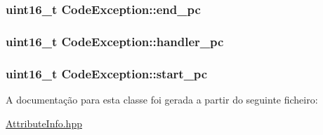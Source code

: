 \subsubsection[{\texorpdfstring{end\+\_\+pc}{end_pc}}]{\setlength{\rightskip}{0pt plus 5cm}uint16\+\_\+t Code\+Exception\+::end\+\_\+pc}\hypertarget{class_code_exception_a357306bca81fcf2e7bc9dfcedc9c4f96}{}\label{class_code_exception_a357306bca81fcf2e7bc9dfcedc9c4f96}
\subsubsection[{\texorpdfstring{handler\+\_\+pc}{handler_pc}}]{\setlength{\rightskip}{0pt plus 5cm}uint16\+\_\+t Code\+Exception\+::handler\+\_\+pc}\hypertarget{class_code_exception_a8c66a2462bd2668d7824e7f3745385d6}{}\label{class_code_exception_a8c66a2462bd2668d7824e7f3745385d6}
\subsubsection[{\texorpdfstring{start\+\_\+pc}{start_pc}}]{\setlength{\rightskip}{0pt plus 5cm}uint16\+\_\+t Code\+Exception\+::start\+\_\+pc}\hypertarget{class_code_exception_a18754b054d8331acbad758612698e599}{}\label{class_code_exception_a18754b054d8331acbad758612698e599}


A documentação para esta classe foi gerada a partir do seguinte ficheiro\+:\begin{DoxyCompactItemize}
\item 
\hyperlink{_attribute_info_8hpp}{Attribute\+Info.\+hpp}\end{DoxyCompactItemize}
